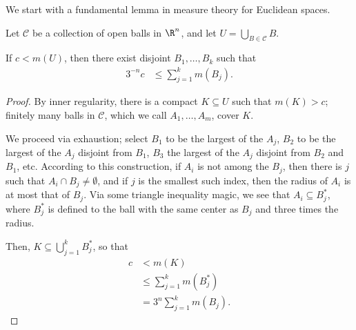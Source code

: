 \documentclass[10pt]{mypackage}
\begin{document}
We start with a fundamental lemma in measure theory for Euclidean spaces.
\begin{theorem}
  Let $\mathcal{C}$ be a collection of open balls in $\R^n$, and let $U = \bigcup_{B\in \mathcal{C}} B$.\newline

  If $c < m\left( U \right)$, then there exist disjoint $B_1,\dots,B_k$ such that
  \begin{align*}
    3^{-n} c &\leq \sum_{j=1}^{k} m\left( B_j \right).
  \end{align*}
\end{theorem}
\begin{proof}
  By inner regularity, there is a compact $K\subseteq U$ such that $m(K) > c$; finitely many balls in $\mathcal{C}$, which we call $A_1,\dots,A_m$, cover $K$.\newline

  We proceed via exhaustion; select $B_1$ to be the largest of the $A_j$, $B_2$ to be the largest of the $A_j$ disjoint from $B_1$, $B_3$ the largest of the $A_j$ disjoint from $B_2$ and $B_1$, etc. According to this construction, if $A_i$ is not among the $B_j$, then there is $j$ such that $A_i\cap B_j \neq \emptyset$, and if $j$ is the smallest such index, then the radius of $A_i$ is at most that of $B_j$. Via some triangle inequality magic, we see that $A_i\subseteq B_j^{\ast}$, where $B_j^{\ast}$ is defined to the ball with the same center as $B_j$ and three times the radius.\newline

  Then, $K\subseteq \bigcup_{j=1}^{k}B_j^{\ast}$, so that
  \begin{align*}
    c &< m(K)\\
      &\leq \sum_{j=1}^{k} m\left( B_j^{\ast} \right)\\
      &= 3^{n} \sum_{j=1}^{k} m\left( B_j \right).
  \end{align*}
\end{proof}
\end{document}
